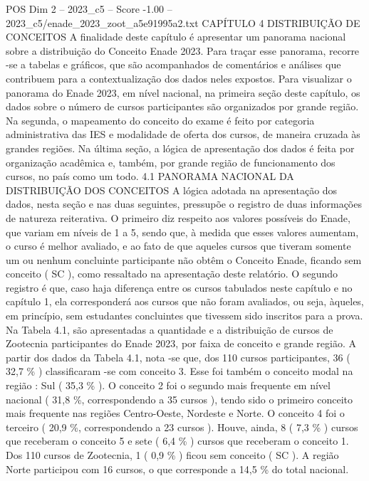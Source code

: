 \begin{textsample}{POS Dim 2 – 2023\_c5 – Score -1.00 – 2023\_c5/enade\_2023\_zoot\_a5e91995a2.txt}  \label{ex:f2_pos_255}
CAPÍTULO 4 DISTRIBUIÇÃO DE CONCEITOS A finalidade deste capítulo é apresentar um panorama nacional sobre a distribuição do Conceito Enade 2023.
Para traçar esse panorama, recorre -se a tabelas e gráficos, que são acompanhados de comentários e análises que contribuem para a contextualização dos dados neles expostos.
Para visualizar o panorama do Enade 2023, em nível nacional, na primeira seção deste capítulo, os dados sobre o número de cursos participantes são organizados por grande região.
Na segunda, o mapeamento do conceito do exame é feito por categoria administrativa das IES e modalidade de oferta dos cursos, de maneira cruzada às grandes regiões.
Na última seção, a lógica de apresentação dos dados é feita por organização acadêmica e, também, por grande região de funcionamento dos cursos, no país como um todo. 4.1 PANORAMA NACIONAL DA DISTRIBUIÇÃO DOS CONCEITOS A lógica adotada na apresentação dos dados, nesta seção e nas duas seguintes, pressupõe o registro de duas informações de natureza reiterativa.
O primeiro diz respeito aos valores possíveis do Enade, que variam em níveis de 1 a 5, sendo que, à medida que esses valores aumentam, o curso é melhor avaliado, e ao fato de que aqueles cursos que tiveram somente um ou nenhum concluinte participante não obtêm o Conceito Enade, ficando sem conceito ( SC ), como ressaltado na apresentação deste relatório.
O segundo registro é que, caso haja diferença entre os cursos tabulados neste capítulo e no capítulo 1, ela corresponderá aos cursos que não foram avaliados, ou seja, àqueles, em princípio, sem estudantes concluintes que tivessem sido inscritos para a prova.
Na Tabela 4.1, são apresentadas a quantidade e a distribuição de cursos de Zootecnia participantes do Enade 2023, por faixa de conceito e grande região.
A partir dos dados da Tabela 4.1, nota -se que, dos 110 cursos participantes, 36 ( 32,7 \% ) classificaram -se com conceito 3.
Esse foi também o conceito modal na região : Sul ( 35,3 \% ).
O conceito 2 foi o segundo mais frequente em nível nacional ( 31,8 \%, correspondendo a 35 cursos ), tendo sido o primeiro conceito mais frequente nas regiões Centro-Oeste, Nordeste e Norte.
O conceito 4 foi o terceiro ( 20,9 \%, correspondendo a 23 cursos ).
Houve, ainda, 8 ( 7,3 \% ) cursos que receberam o conceito 5 e sete ( 6,4 \% ) cursos que receberam o conceito 1.
Dos 110 cursos de Zootecnia, 1 ( 0,9 \% ) ficou sem conceito ( SC ).
A região Norte participou com 16 cursos, o que corresponde a 14,5 \% do total nacional.

\end{textsample}
